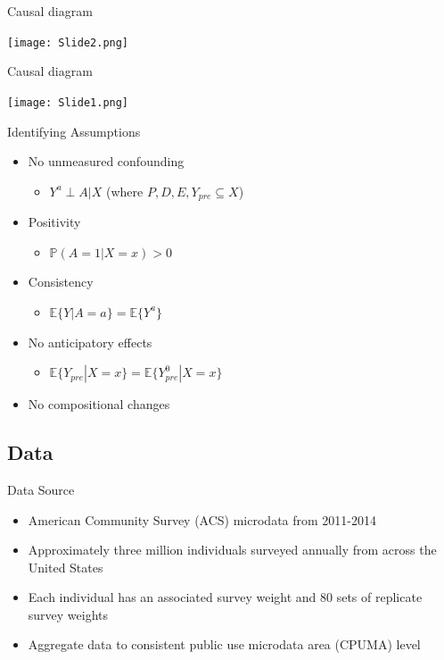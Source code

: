 \documentclass[hyperref={pdfpagelabels=false}]{beamer}
\begin{document}
\begin{frame}{Causal diagram}
    \begin{center}
	\texttt{[image: Slide2.png]}
    \end{center}
\end{frame}

\begin{frame}{Causal diagram}
    \begin{center}
	\texttt{[image: Slide1.png]}
    \end{center}
\end{frame}

\begin{frame}{Identifying Assumptions}

\begin{itemize}
    \item No unmeasured confounding
    \begin{itemize}
        \item $Y^a \perp A | X$ (where $P, D, E, Y_{pre} \subseteq X$) \bigskip 
    \end{itemize}
    \item Positivity
    \begin{itemize}
        \item $\mathbb{P}(A = 1 | X = x) > 0$  \bigskip 
    \end{itemize}
    \item Consistency
    \begin{itemize}
        \item $\mathbb{E}\{Y | A = a\} = \mathbb{E}\{Y^a\}$ \bigskip 
    \end{itemize}
    \item No anticipatory effects
    \begin{itemize}
        \item $\mathbb{E}\{Y_{pre} | X = x\} = \mathbb{E}\{Y^0_{pre} | X = x\}$ \bigskip 
    \end{itemize}
        \item No compositional changes
\end{itemize}

\end{frame}

\subsection{Data}

\begin{frame}{Data Source}
    \begin{itemize}
    \item American Community Survey (ACS) microdata from 2011-2014 \bigskip 
    \item Approximately three million individuals surveyed annually from across the United States \bigskip 
    \item Each individual has an associated survey weight and 80 sets of replicate survey weights \bigskip 
    \item Aggregate data to consistent public use microdata area (CPUMA) level
    \end{itemize}
\end{frame}   
\end{document}
